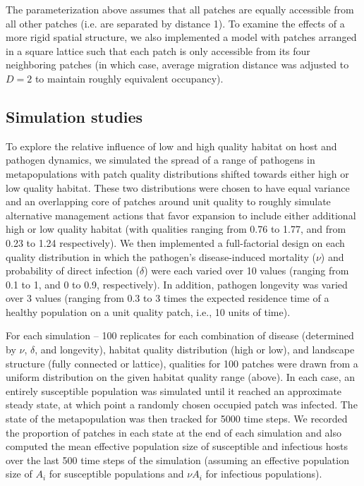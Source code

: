 \documentclass{article}
\begin{document}
The parameterization above assumes that all patches are equally accessible from all other patches (i.e. are separated by distance 1).  To examine the effects of a more rigid spatial structure, we also implemented a model with patches arranged in a square lattice such that each patch is only accessible from its four neighboring patches (in which case, average migration distance was adjusted to $D = 2$ to maintain roughly equivalent occupancy).  

\subsection{Simulation studies}

To explore the relative influence of low and high quality habitat on host and pathogen dynamics, we simulated the spread of a range of pathogens in metapopulations with patch quality distributions shifted towards either high or low quality habitat.
These two distributions were chosen to have equal variance and an overlapping core of patches around unit quality to roughly simulate alternative management actions that favor expansion to include either additional high or low quality habitat (with qualities ranging from 0.76 to 1.77, and from 0.23 to 1.24 respectively).  
We then implemented a full-factorial design on each quality distribution in which the pathogen's disease-induced mortality ($\nu$) and probability of direct infection ($\delta$) were each varied over 10 values (ranging from 0.1 to 1, and 0 to 0.9, respectively).  In addition, pathogen longevity was varied over 3 values (ranging from 0.3 to 3 times the expected residence time of a healthy population on a unit quality patch, i.e., 10 units of time).

For each simulation -- 100 replicates for each combination of disease (determined by $\nu$, $\delta$, and longevity), habitat quality distribution (high or low), and landscape structure (fully connected or lattice), qualities for 100 patches were drawn from a uniform distribution on the given habitat quality range (above). In each case, an entirely susceptible population was simulated until it reached an approximate steady state, at which point a randomly chosen occupied patch was infected.  The state of the metapopulation was then tracked for 5000 time steps.  We recorded the proportion of patches in each state at the end of each simulation and also computed the mean effective population size of susceptible and infectious hosts over the last 500 time steps of the simulation (assuming an effective population size of $A_i$ for susceptible populations and $\nu A_i$ for infectious populations).    
\end{document}
